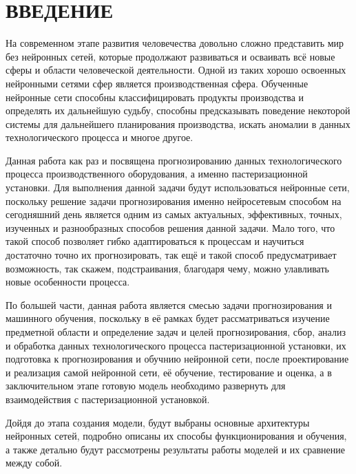 \sectionbreak \section*{ 
    \cyrillicfont
    \fontsize{14pt}{24pt}\selectfont 
    \redline
    ВВЕДЕНИЕ
}
\titlespace

{\cyrillicfont %
\fontsize{13pt}{16.25pt}\selectfont %
\englishfont %

\par \redline На современном этапе развития человечества довольно сложно представить мир без нейронных сетей, которые продолжают развиваться и осваивать всё новые сферы и области человеческой деятельности. Одной из таких хорошо освоенных нейронными сетями сфер является производственная сфера. Обученные нейронные сети способны классифицировать продукты производства и определять их дальнейшую судьбу, способны предсказывать поведение некоторой системы для дальнейшего планирования производства, искать аномалии в данных технологического процесса и многое другое. 

\par \redline Данная работа как раз и посвящена прогнозированию данных технологического процесса производственного оборудования, а именно пастеризационной установки. Для выполнения данной задачи будут использоваться нейронные сети, поскольку решение задачи прогнозирования именно нейросетевым способом на сегодняшний день является одним из самых актуальных, эффективных, точных, изученных и разнообразных способов решения данной задачи. Мало того, что такой способ позволяет гибко адаптироваться к процессам и научиться достаточно точно их прогнозировать, так ещё и такой способ предусматривает возможность, так скажем, подстраивания, благодаря чему, можно улавливать новые особенности процесса. 

\par \redline По большей части, данная работа является смесью задачи прогнозирования и машинного обучения, поскольку в её рамках будет рассматриваться изучение предметной области и определение задач и целей прогнозирования, сбор, анализ и обработка данных технологического процесса пастеризационной установки, их подготовка к прогнозирования и обучнию нейронной сети, после проектирование и реализация самой нейронной сети, её обучение, тестирование и оценка, а в заключительном этапе готовую модель необходимо развернуть для взаимодействия с пастеризационной установкой.

\par \redline Дойдя до этапа создания модели, будут выбраны основные архитектуры нейронных сетей, подробно описаны их способы функционирования и обучения, а также детально будут рассмотрены результаты работы моделей и их сравнение между собой.

\par
}
